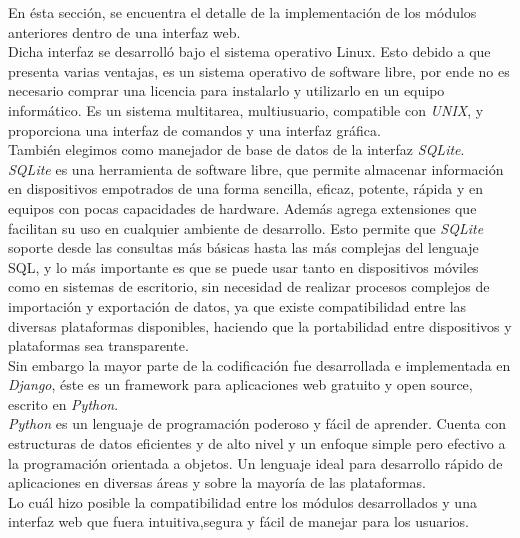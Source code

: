 En ésta sección, se encuentra el detalle de la implementación de los módulos anteriores dentro de una interfaz web.\\
Dicha interfaz se desarrolló bajo el sistema operativo Linux. Esto debido a que presenta varias ventajas, es un sistema operativo de software libre, por ende no es necesario comprar una licencia para instalarlo y utilizarlo en un equipo informático. Es un sistema multitarea, multiusuario, compatible con \textit{UNIX}, y proporciona una interfaz de comandos y una interfaz gráfica.\\
También elegimos como manejador de base de datos de la interfaz \textit{SQLite}.\\
\textit{SQLite} es una herramienta de software libre, que permite almacenar información en dispositivos empotrados de una forma sencilla, eficaz, potente, rápida y en equipos con pocas capacidades de hardware. Además agrega extensiones que facilitan su uso en cualquier ambiente de desarrollo. Esto permite que \textit{SQLite} soporte desde las consultas más básicas hasta las más complejas del lenguaje SQL, y lo más importante es que se puede usar tanto en dispositivos móviles como en sistemas de escritorio, sin necesidad de realizar procesos complejos de importación y exportación de datos, ya que existe compatibilidad entre las diversas plataformas disponibles, haciendo que la portabilidad entre dispositivos y plataformas sea transparente.\\
Sin embargo la mayor parte de la codificación fue desarrollada e implementada en \textit{Django}, éste es un framework para aplicaciones web gratuito y open source, escrito en \textit{Python}.\\
\textit{Python} es un lenguaje de programación poderoso y fácil de aprender. Cuenta con estructuras de datos eficientes y de alto nivel y un enfoque simple pero efectivo a la programación orientada a objetos. Un lenguaje ideal para desarrollo rápido de aplicaciones en diversas áreas y sobre la mayoría de las plataformas.\\
Lo cuál hizo posible la compatibilidad entre los módulos desarrollados y una interfaz web que fuera intuitiva,segura y fácil de manejar para los usuarios.\\ 



